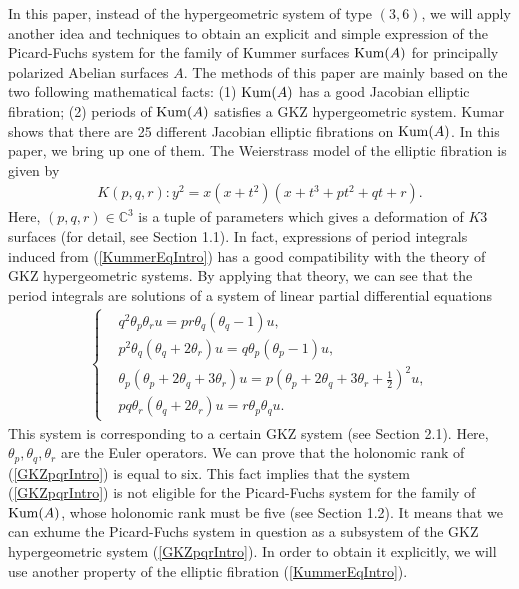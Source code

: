 \documentclass[10pt]{article}
\begin{document}
In this paper, instead of the hypergeometric system of type $(3,6)$,
we will apply another idea and techniques to obtain an explicit and simple expression of the Picard-Fuchs system  for the family of Kummer surfaces ${\rm Kum}(A)$ for  principally polarized Abelian surfaces $A$.
The methods of this paper are mainly based on the two following mathematical facts:
(1) ${\rm Kum}(A)$ has a good Jacobian elliptic fibration;
(2) periods of ${\rm Kum}(A)$ satisfies a GKZ hypergeometric system.
Kumar \cite{Kumar} shows that there are 25 different Jacobian elliptic fibrations on ${\rm Kum} (A)$.
In this paper, we bring up one of them.
The Weierstrass model of the elliptic fibration is given by 
\begin{align}\label{KummerEqIntro}
K(p,q,r): y^2 =x(x+t^2) (x+t^3 +p t^2 + q t +r).
\end{align}
Here, $(p,q,r) \in \mathbb{C}^3$ is a tuple of parameters which gives a deformation of $K3$ surfaces  (for detail, see Section 1.1).
In fact, expressions of period integrals induced from (\ref{KummerEqIntro}) has a good compatibility with the theory of GKZ hypergeometric systems.
By applying that theory, we can see that the period integrals are solutions of a system of linear partial differential equations 
\begin{align}\label{GKZpqrIntro}
\begin{cases}
&\displaystyle q^2 \theta_p \theta_r  u= pr \theta_q (\theta_q -1)u  ,\\
&\displaystyle  p^2 \theta_q(\theta_q + 2 \theta_r) u =  q \theta_p(\theta_p -1) u, \\
&\displaystyle  \theta_p (\theta_p+2\theta_q + 3 \theta_r) u = p \left(\theta_p + 2\theta_q+3\theta_r+\frac{1}{2}\right)^2 u,\\
&\displaystyle  p q \theta_r(\theta_q+2\theta_r)u = r \theta_p \theta_q u.
\end{cases}
\end{align}
This system is corresponding to a certain GKZ system (see Section 2.1).
Here, $\theta_p,\theta_q,\theta_r$ are the Euler operators.
We can prove that the holonomic rank of (\ref{GKZpqrIntro}) is equal to six.
This fact implies that
the system (\ref{GKZpqrIntro}) is not eligible for the Picard-Fuchs system for the family of ${\rm Kum}(A)$,
whose holonomic rank  must be five (see Section 1.2).
It means that we can exhume the Picard-Fuchs system in question as a subsystem of the GKZ hypergeometric system (\ref{GKZpqrIntro}).
In order to obtain it explicitly,
we will use another property of the elliptic fibration (\ref{KummerEqIntro}).
\end{document}

